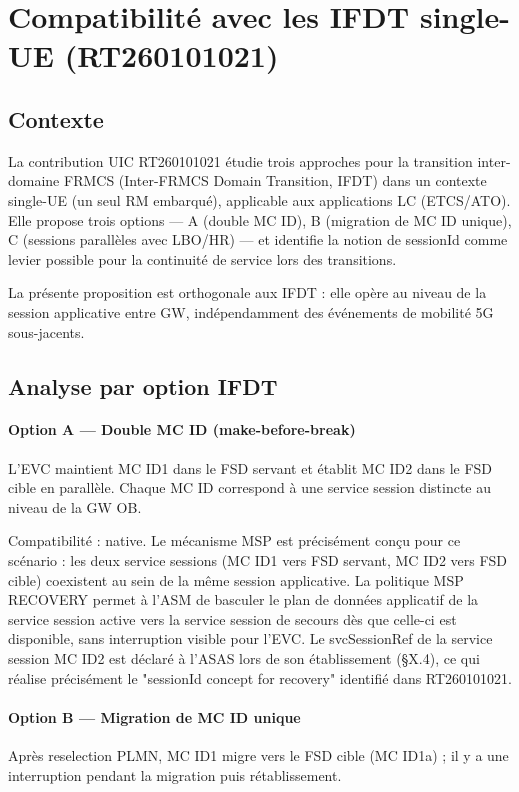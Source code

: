 \documentclass[11pt,a4paper]{article}
\begin{document}
\section{Compatibilité avec les IFDT single-UE (RT260101021)}
\subsection{Contexte}
La contribution UIC RT260101021 étudie trois approches pour la transition inter-domaine FRMCS (Inter-FRMCS Domain Transition, IFDT) dans un contexte single-UE (un seul RM embarqué), applicable aux applications LC (ETCS/ATO). Elle propose trois options — A (double MC ID), B (migration de MC ID unique), C (sessions parallèles avec LBO/HR) — et identifie la notion de sessionId comme levier possible pour la continuité de service lors des transitions.

La présente proposition est orthogonale aux IFDT : elle opère au niveau de la session applicative entre GW, indépendamment des événements de mobilité 5G sous-jacents.

\subsection{Analyse par option IFDT}
\paragraph{Option A — Double MC ID (make-before-break)}
L'EVC maintient MC ID1 dans le FSD servant et établit MC ID2 dans le FSD cible en parallèle. Chaque MC ID correspond à une service session distincte au niveau de la GW OB.

Compatibilité : native. Le mécanisme MSP est précisément conçu pour ce scénario : les deux service sessions (MC ID1 vers FSD servant, MC ID2 vers FSD cible) coexistent au sein de la même session applicative. La politique MSP RECOVERY permet à l'ASM de basculer le plan de données applicatif de la service session active vers la service session de secours dès que celle-ci est disponible, sans interruption visible pour l'EVC. Le svcSessionRef de la service session MC ID2 est déclaré à l'ASAS lors de son établissement (§X.4), ce qui réalise précisément le "sessionId concept for recovery" identifié dans RT260101021.

\paragraph{Option B — Migration de MC ID unique}
Après reselection PLMN, MC ID1 migre vers le FSD cible (MC ID1a) ; il y a une interruption pendant la migration puis rétablissement.
\end{document}
